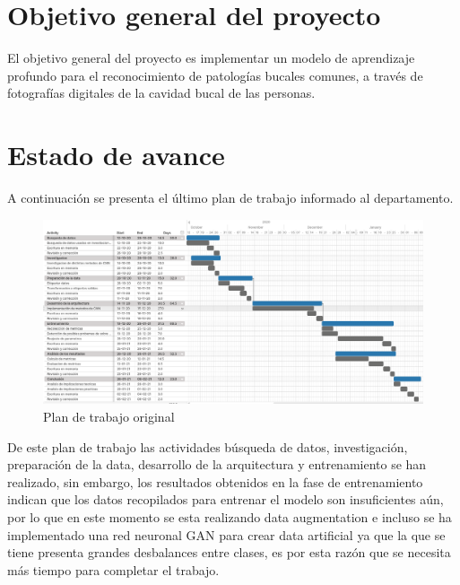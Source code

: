 \section{Objetivo general del proyecto}
El objetivo general del proyecto es implementar un modelo de aprendizaje profundo para el reconocimiento de patologías bucales comunes, a través de fotografías digitales de la cavidad bucal de las personas.


\section{Estado de avance}
A continuación se presenta el último plan de trabajo informado al departamento.

\begin{figure}[!ht]
    \centering
    \includegraphics[scale=0.457]{images/planTrabajo.png}
    \caption{Plan de trabajo original}
    \label{fig:planTrabajo}
\end{figure}

De este plan de trabajo las actividades búsqueda de datos, investigación, preparación de la data, desarrollo de la arquitectura y entrenamiento se han realizado, sin embargo, los resultados obtenidos en la fase de entrenamiento indican que los datos recopilados para entrenar el modelo son insuficientes aún, por lo que en este momento se esta realizando data augmentation e incluso se ha implementado una red neuronal GAN para crear data artificial ya que la que se tiene presenta grandes desbalances entre clases, es por esta razón que se necesita más tiempo para completar el trabajo.

